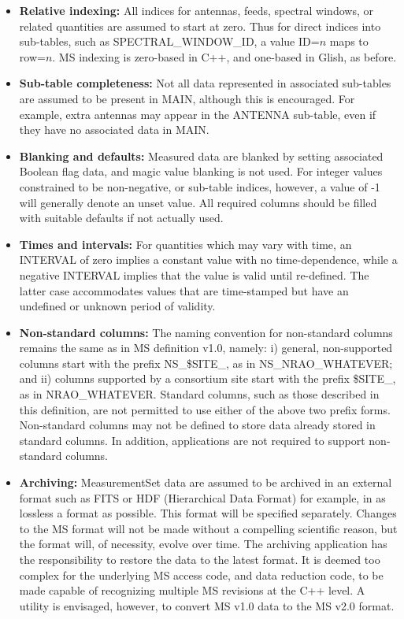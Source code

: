 \documentclass{article}
\begin{document}
\begin{itemize}
\item{{\bf Relative indexing:} All indices for antennas, feeds,
spectral windows, or related quantities are assumed to start at zero.
Thus for direct indices into sub-tables, such as SPECTRAL\_WINDOW\_ID,
a value ID=$n$ maps to row=$n$. MS indexing is zero-based in C++, and
one-based in Glish, as before.}

\item{{\bf Sub-table completeness:} Not all data represented in
associated sub-tables are assumed to be present in MAIN, although this
is encouraged. For example, extra antennas may appear in the ANTENNA
sub-table, even if they have no associated data in MAIN.}

\item{{\bf Blanking and defaults:} Measured data are blanked by
setting associated Boolean flag data, and magic value blanking is not
used. For integer values constrained to be non-negative, or sub-table
indices, however, a value of -1 will generally denote an unset
value. All required columns should be filled with suitable defaults if
not actually used.}

\item{{\bf Times and intervals:} For quantities which may vary with
time, an INTERVAL of zero implies a constant value with no
time-dependence, while a negative INTERVAL implies that the value is
valid until re-defined. The latter case accommodates values that are
time-stamped but have an undefined or unknown period of validity.}

\item{{\bf Non-standard columns:} The naming convention for
non-standard columns remains the same as in MS definition v1.0,
namely: i) general, non-supported columns start with the prefix
NS\_\$SITE\_, as in NS\_NRAO\_WHATEVER; and ii) columns supported by a
consortium site start with the prefix \$SITE\_, as in
NRAO\_WHATEVER. Standard columns, such as those described in this
definition, are not permitted to use either of the above two prefix
forms. Non-standard columns may not be defined to store data already
stored in standard columns. In addition, applications are not required
to support non-standard columns.}

\item{{\bf Archiving:} MeasurementSet data are assumed to be archived
in an external format such as FITS or HDF (Hierarchical Data Format)
for example, in as lossless a format as possible. This format will be
specified separately. Changes to the MS format will not be made
without a compelling scientific reason, but the format will, of
necessity, evolve over time. The archiving application has the
responsibility to restore the data to the latest format. It is deemed
too complex for the underlying MS access code, and data reduction
code, to be made capable of recognizing multiple MS revisions at the
C++ level. A utility is envisaged, however, to convert MS v1.0 data to
the MS v2.0 format.}

\end{itemize}
\end{document}
